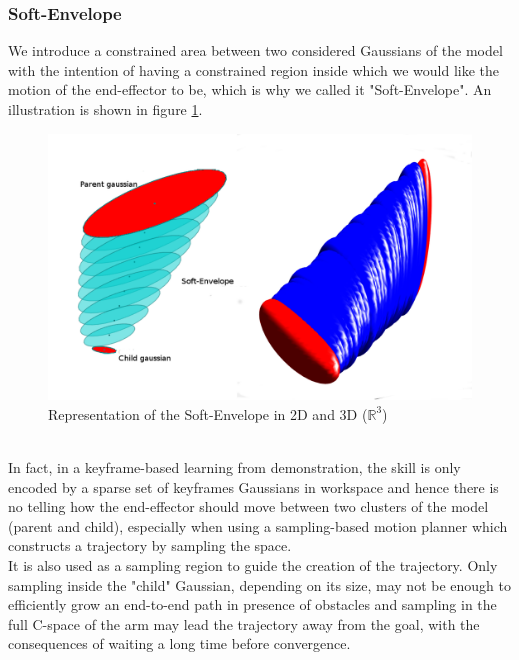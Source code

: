 \documentclass[letterpaper, 10 pt, conference]{ieeeconf}  %
\begin{document}
\subsubsection{Soft-Envelope}\leavevmode\par
We introduce a constrained area between two considered Gaussians  of the model with the intention of having a constrained region inside which we would like the motion of the end-effector to be, which is why we called it "Soft-Envelope". An illustration is shown in figure \ref{MixSoftEnvelope}.\\ 
\begin{figure}[h]
	\centering
	\includegraphics[scale=0.23]{figure/MixSoftEnvelope.png}
	\caption{Representation of the Soft-Envelope in 2D and 3D ($\mathbb{R}^{3}$)}
	\label{MixSoftEnvelope}
\end{figure}
\\
 In fact, in a keyframe-based learning from demonstration, the skill is only encoded by a sparse set of keyframes Gaussians in workspace and hence there is no telling how the end-effector should move between two clusters of the model (parent and child), especially when using a sampling-based motion planner which constructs a trajectory by sampling the space.\\
 It is also used as a sampling region to guide the creation of the trajectory. Only sampling inside the "child" Gaussian, depending on its size, may not be enough to efficiently grow an end-to-end path in presence of obstacles and sampling in the full C-space of the arm may lead the trajectory away from the goal, with the consequences of waiting a long time before convergence.\\
 
\end{document}
